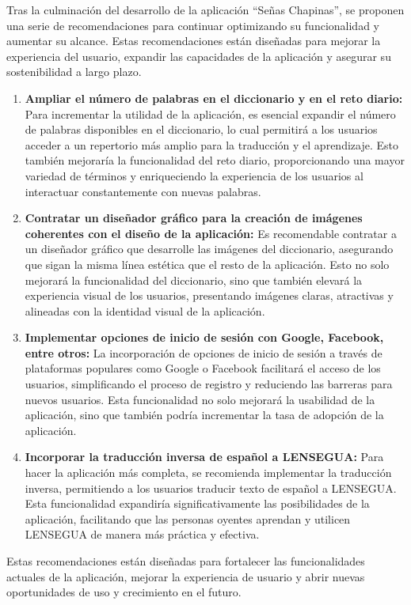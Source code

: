 
Tras la culminación del desarrollo de la aplicación ``Señas Chapinas'', se proponen una serie de recomendaciones para continuar optimizando su funcionalidad y aumentar su alcance. Estas recomendaciones están diseñadas para mejorar la experiencia del usuario, expandir las capacidades de la aplicación y asegurar su sostenibilidad a largo plazo.

\begin{enumerate}
    \item \textbf{Ampliar el número de palabras en el diccionario y en el reto diario:} 
    Para incrementar la utilidad de la aplicación, es esencial expandir el número de palabras disponibles en el diccionario, lo cual permitirá a los usuarios acceder a un repertorio más amplio para la traducción y el aprendizaje. Esto también mejoraría la funcionalidad del reto diario, proporcionando una mayor variedad de términos y enriqueciendo la experiencia de los usuarios al interactuar constantemente con nuevas palabras.

    \item \textbf{Contratar un diseñador gráfico para la creación de imágenes coherentes con el diseño de la aplicación:} 
    Es recomendable contratar a un diseñador gráfico que desarrolle las imágenes del diccionario, asegurando que sigan la misma línea estética que el resto de la aplicación. Esto no solo mejorará la funcionalidad del diccionario, sino que también elevará la experiencia visual de los usuarios, presentando imágenes claras, atractivas y alineadas con la identidad visual de la aplicación.

    \item \textbf{Implementar opciones de inicio de sesión con Google, Facebook, entre otros:} 
    La incorporación de opciones de inicio de sesión a través de plataformas populares como Google o Facebook facilitará el acceso de los usuarios, simplificando el proceso de registro y reduciendo las barreras para nuevos usuarios. Esta funcionalidad no solo mejorará la usabilidad de la aplicación, sino que también podría incrementar la tasa de adopción de la aplicación.

    \item \textbf{Incorporar la traducción inversa de español a LENSEGUA:} 
    Para hacer la aplicación más completa, se recomienda implementar la traducción inversa, permitiendo a los usuarios traducir texto de español a LENSEGUA. Esta funcionalidad expandiría significativamente las posibilidades de la aplicación, facilitando que las personas oyentes aprendan y utilicen LENSEGUA de manera más práctica y efectiva.
\end{enumerate}

Estas recomendaciones están diseñadas para fortalecer las funcionalidades actuales de la aplicación, mejorar la experiencia de usuario y abrir nuevas oportunidades de uso y crecimiento en el futuro.
